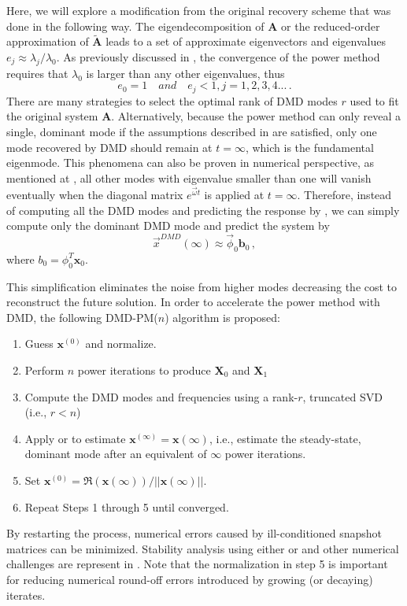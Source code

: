 Here, we will explore a modification from the original recovery scheme that was done in the following way.
The eigendecomposition of $\mathbf{A}$ or the reduced-order approximation of $\mathbf{\tilde{A}}$ leads to a set of approximate eigenvectors and eigenvalues $e_j \approx \lambda_j / \lambda_0$.
As previously discussed in , the convergence of the power method requires that $\lambda_0$ is larger than any other eigenvalues, thus 
\begin{equation}
\label{eq:ej}
e_0 = 1 \quad and  \quad e_j < 1,j = 1,2,3,4... \, .
\end{equation}
There are many strategies to select the optimal rank of DMD modes $r$ used to fit the original system $\mathbf{A}$. 
Alternatively, because the power method can only reveal a single, dominant mode if the assumptions described in  are satisfied, only one mode recovered by DMD should remain at $t=\infty$, which is the fundamental eigenmode.
This phenomena can also be proven in numerical perspective, as mentioned at , all other modes with eigenvalue smaller than one will vanish eventually when the diagonal matrix $e^{\vec{\omega}t}$ is applied at $t=\infty$.
Therefore, instead of computing all the DMD modes and predicting the response by , we can simply compute only the dominant DMD mode and predict the system by 
\begin{equation}
\label{eq:f_mode}
\vec{x}^{DMD}(\infty) \approx \vec{\phi}_0 \mathbf{b}_0 \, ,
\end{equation}
where $b_0= \phi^{T}_0 \mathbf{x}_{0}$.

This simplification eliminates the noise from higher modes decreasing the cost to reconstruct the future solution.
In order to accelerate the power method with DMD, the following DMD-PM($n$) algorithm is proposed:
\begin{enumerate}
 \item Guess $\mathbf{x}^{(0)}$ and normalize.
 \item Perform $n$ power iterations to produce $\mathbf{X}_0$ and $\mathbf{X}_1$
 \item Compute the DMD modes and frequencies using a rank-$r$, truncated  SVD (i.e., $r < n$)
 \item Apply  or  to estimate $\mathbf{x}^{(\infty)}=\mathbf{x}(\infty)$, i.e., estimate the steady-state, dominant mode after an equivalent of $\infty$ power iterations.
 \item Set $\mathbf{x}^{(0)} = \Re(\mathbf{x}(\infty)) / ||\mathbf{x}(\infty)||$.  
 \item Repeat Steps 1 through 5 until converged.
\end{enumerate}
By restarting the process, numerical errors caused by ill-conditioned snapshot matrices can be minimized.
Stability analysis using either  or  and other numerical challenges are represent in .
Note that the normalization in step 5 is important for reducing numerical round-off errors introduced by growing (or decaying) iterates.



